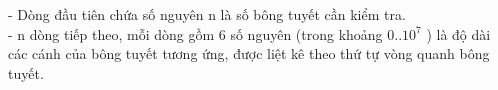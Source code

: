 - Dòng đầu tiên chứa số nguyên n là số bông tuyết cần kiểm tra.   
\\   - n dòng tiếp theo, mỗi dòng gồm 6 số nguyên (trong khoảng 0..$10^{7}$   ) là độ dài các cánh của bông tuyết tương ứng, được liệt kê theo thứ tự vòng quanh bông tuyết.